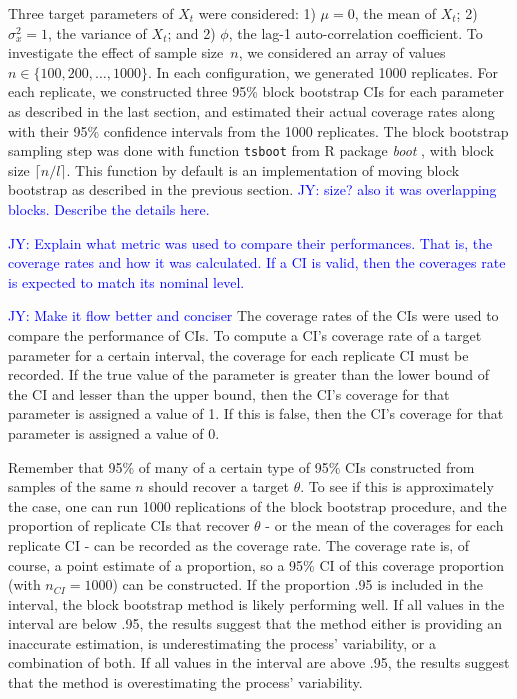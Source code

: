 \documentclass[12pt, letterpaper, titlepage]{article}
\newcommand{\jy}[1]{\textcolor{blue}{JY: #1}}
\begin{document}
Three target parameters of $X_t$ were considered:
1) $\mu = 0$, the mean of $X_t$;
2) $\sigma_x^2 = 1$, the variance of $X_t$; and
2) $\phi$, the lag-1 auto-correlation coefficient.
To investigate the effect of sample size~$n$, we considered an array of values
$n \in \{100, 200, \ldots, 1000\}$. In each configuration, we generated 1000
replicates. For each replicate, we constructed three 95\% block bootstrap
CIs for each parameter as described in the last section, and
estimated their actual coverage rates along with their 95\% confidence
intervals from the 1000 replicates. The block bootstrap sampling step was done
with function \texttt{tsboot} from R package \textsl{boot} \citep{boot}, with
block size $\lceil n / l \rceil$. This function by default is an implementation
of moving block bootstrap as described in the previous section.
\jy{size? also it was overlapping blocks. Describe the details here.}


\jy{Explain what metric was used to compare their performances. That is, the
  coverage rates and how it was calculated. If a CI is valid, then the coverages
  rate is expected to match its nominal level.}

\jy{Make it flow better and conciser}
The coverage rates of the CIs were used to compare the performance of CIs. To
compute a CI's coverage rate of a target parameter for a certain interval,
the coverage for each replicate CI must be recorded. If the true value of the
parameter is greater than the lower bound of the CI and lesser than the upper
bound, then the CI's coverage for that parameter is assigned a value of 1. If
this is false, then the CI's coverage for that parameter is assigned a value
of 0.


Remember that 95\% of many of a certain type of 95\% CIs constructed from
samples of the same $n$ should recover a target $\theta$. To see if this is
approximately the case, one can run 1000 replications of the block bootstrap
procedure, and the proportion of replicate CIs that recover $\theta$ - or the
mean of the coverages for each replicate CI - can be
recorded as the coverage rate. The coverage rate is, of course, a
point estimate of a proportion, so a 95\% CI of this coverage
proportion (with $n_{CI} = 1000$) can be constructed. If the proportion
.95 is included in the interval, the block bootstrap method is likely
performing
well. If all values in the interval are below .95, the results suggest that the
method either is providing an inaccurate estimation, is underestimating the
process' variability, or a combination of both. If all values in the interval
are above .95, the results suggest that the method is overestimating the
process' variability.
\end{document}
